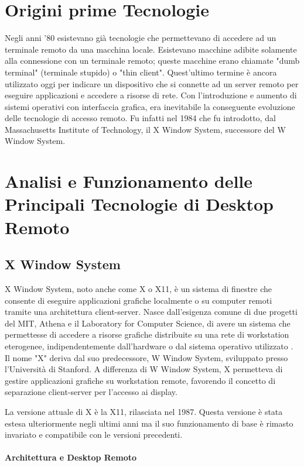 \documentclass[12pt,a4paper,openright,twoside]{book}
\begin{document}
\section{Origini prime Tecnologie}
Negli anni '80 esistevano già tecnologie che permettevano di accedere ad un terminale remoto da una macchina locale. Esistevano macchine adibite solamente alla connessione con un terminale remoto; queste macchine erano chiamate "dumb terminal" (terminale stupido) o "thin client". Quest'ultimo termine è ancora utilizzato oggi per indicare un dispositivo che si connette ad un server remoto per eseguire applicazioni e accedere a risorse di rete.
Con l'introduzione e aumento di sistemi operativi con interfaccia grafica, era inevitabile la conseguente evoluzione delle tecnologie di accesso remoto. Fu infatti nel 1984 che fu introdotto, dal Massachusetts Institute of Technology, il X Window System, successore del W Window System.

\section{Analisi e Funzionamento delle Principali Tecnologie di Desktop Remoto} 

\subsection{X Window System}
X Window System, noto anche come X o X11, è un sistema di finestre che consente di eseguire applicazioni grafiche localmente o su computer remoti tramite una architettura client-server. 
Nasce dall'esigenza comune di due progetti del MIT, Athena e il Laboratory for Computer Science, di avere un sistema che permettesse di accedere a risorse grafiche distribuite su una rete di workstation eterogenee, indipendentemente dall'hardware o dal sistema operativo utilizzato \cite{Scheifler1986}. 
Il nome "X" deriva dal suo predecessore, W Window System, sviluppato presso l'Università di Stanford. A differenza di W Window System, X permetteva di gestire applicazioni grafiche su workstation remote, favorendo il concetto di separazione client-server per l'accesso ai display.

La versione attuale di X è la X11, rilasciata nel 1987. Questa versione è stata estesa ulteriormente negli ultimi anni ma il suo funzionamento di base è rimasto invariato e compatibile con le versioni precedenti.

\paragraph{Architettura e Desktop Remoto}
\end{document}
